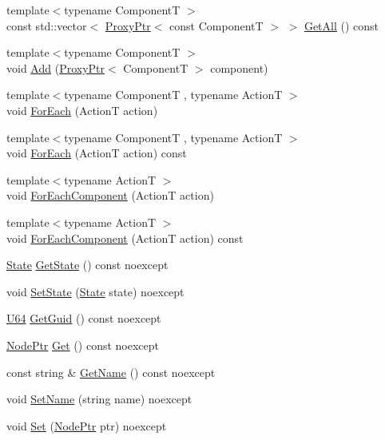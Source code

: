 \begin{DoxyCompactItemize}
\item 
{\footnotesize template$<$typename ComponentT $>$ }\\const std\+::vector$<$ \hyperlink{classmage_1_1_proxy_ptr}{Proxy\+Ptr}$<$ const ComponentT $>$ $>$ \hyperlink{classmage_1_1_node_a920ff966a7f970189fcbae86025ab3aa}{Get\+All} () const
\item 
{\footnotesize template$<$typename ComponentT $>$ }\\void \hyperlink{classmage_1_1_node_a58452a6195ebea7a1a7a26f9a4dd8102}{Add} (\hyperlink{classmage_1_1_proxy_ptr}{Proxy\+Ptr}$<$ ComponentT $>$ component)
\item 
{\footnotesize template$<$typename ComponentT , typename ActionT $>$ }\\void \hyperlink{classmage_1_1_node_a5ec6963ed4eb9d0463e220a53555d27a}{For\+Each} (ActionT action)
\item 
{\footnotesize template$<$typename ComponentT , typename ActionT $>$ }\\void \hyperlink{classmage_1_1_node_a27787099b85542ab2e5d3901bdfa8684}{For\+Each} (ActionT action) const
\item 
{\footnotesize template$<$typename ActionT $>$ }\\void \hyperlink{classmage_1_1_node_ac90a83642d3043ac6fc4efd14f922877}{For\+Each\+Component} (ActionT action)
\item 
{\footnotesize template$<$typename ActionT $>$ }\\void \hyperlink{classmage_1_1_node_ac3c83c2fcd0ee99277d0120396ffa81e}{For\+Each\+Component} (ActionT action) const
\item 
\hyperlink{namespacemage_ae47d13d8477ee94893b9a3947d28eebc}{State} \hyperlink{classmage_1_1_node_a05980bc835cf8da96a9abb225eae72da}{Get\+State} () const noexcept
\item 
void \hyperlink{classmage_1_1_node_a9511a52ddcc0bba71a0353338dcd1d9b}{Set\+State} (\hyperlink{namespacemage_ae47d13d8477ee94893b9a3947d28eebc}{State} state) noexcept
\item 
\hyperlink{namespacemage_a6672cf3c861707ce4a3235a3eb43941d}{U64} \hyperlink{classmage_1_1_node_a69d5c613982a4dfd5175538aff6a07a5}{Get\+Guid} () const noexcept
\item 
\hyperlink{classmage_1_1_node_ac575dc006e0ae1134277ade977dc06b6}{Node\+Ptr} \hyperlink{classmage_1_1_node_ac317011c240a845fbdb7209e26d560f2}{Get} () const noexcept
\item 
const string \& \hyperlink{classmage_1_1_node_a206e7c7ef80a0561b31ebbb9d05c98a0}{Get\+Name} () const noexcept
\item 
void \hyperlink{classmage_1_1_node_a78e4ef8457d200662d2f4881cef08688}{Set\+Name} (string name) noexcept
\item 
void \hyperlink{classmage_1_1_node_aabbe500cdf7842b663bfcf034de25c5a}{Set} (\hyperlink{classmage_1_1_node_ac575dc006e0ae1134277ade977dc06b6}{Node\+Ptr} ptr) noexcept
\end{DoxyCompactItemize}
